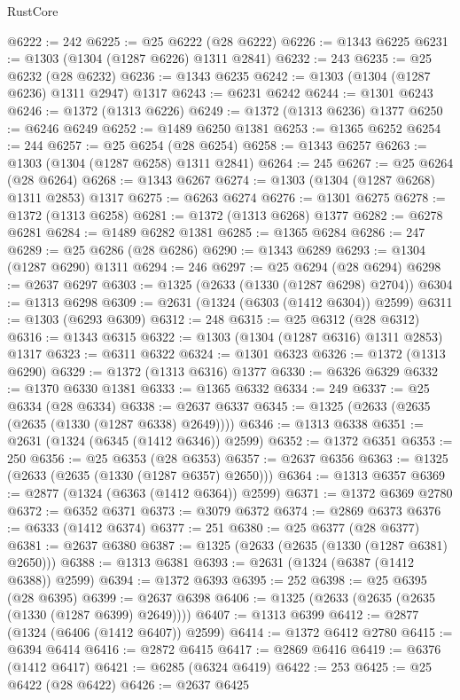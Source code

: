 \begin{lexlean}{RustCore}
\begin{coremodule}
@6222 := 242
@6225 := @25 @6222 (@28 @6222)
@6226 := @1343 @6225
@6231 := @1303 (@1304 (@1287 @6226) @1311 @2841)
@6232 := 243
@6235 := @25 @6232 (@28 @6232)
@6236 := @1343 @6235
@6242 := @1303 (@1304 (@1287 @6236) @1311 @2947) @1317
@6243 := @6231 @6242
@6244 := @1301 @6243
@6246 := @1372 (@1313 @6226)
@6249 := @1372 (@1313 @6236) @1377
@6250 := @6246 @6249
@6252 := @1489 @6250 @1381
@6253 := @1365 @6252
@6254 := 244
@6257 := @25 @6254 (@28 @6254)
@6258 := @1343 @6257
@6263 := @1303 (@1304 (@1287 @6258) @1311 @2841)
@6264 := 245
@6267 := @25 @6264 (@28 @6264)
@6268 := @1343 @6267
@6274 := @1303 (@1304 (@1287 @6268) @1311 @2853) @1317
@6275 := @6263 @6274
@6276 := @1301 @6275
@6278 := @1372 (@1313 @6258)
@6281 := @1372 (@1313 @6268) @1377
@6282 := @6278 @6281
@6284 := @1489 @6282 @1381
@6285 := @1365 @6284
@6286 := 247
@6289 := @25 @6286 (@28 @6286)
@6290 := @1343 @6289
@6293 := @1304 (@1287 @6290) @1311
@6294 := 246
@6297 := @25 @6294 (@28 @6294)
@6298 := @2637 @6297
@6303 := @1325 (@2633 (@1330 (@1287 @6298) @2704))
@6304 := @1313 @6298
@6309 := @2631 (@1324 (@6303 (@1412 @6304)) @2599)
@6311 := @1303 (@6293 @6309)
@6312 := 248
@6315 := @25 @6312 (@28 @6312)
@6316 := @1343 @6315
@6322 := @1303 (@1304 (@1287 @6316) @1311 @2853) @1317
@6323 := @6311 @6322
@6324 := @1301 @6323
@6326 := @1372 (@1313 @6290)
@6329 := @1372 (@1313 @6316) @1377
@6330 := @6326 @6329
@6332 := @1370 @6330 @1381
@6333 := @1365 @6332
@6334 := 249
@6337 := @25 @6334 (@28 @6334)
@6338 := @2637 @6337
@6345 := @1325 (@2633 (@2635 (@2635 (@1330 (@1287 @6338) @2649))))
@6346 := @1313 @6338
@6351 := @2631 (@1324 (@6345 (@1412 @6346)) @2599)
@6352 := @1372 @6351
@6353 := 250
@6356 := @25 @6353 (@28 @6353)
@6357 := @2637 @6356
@6363 := @1325 (@2633 (@2635 (@1330 (@1287 @6357) @2650)))
@6364 := @1313 @6357
@6369 := @2877 (@1324 (@6363 (@1412 @6364)) @2599)
@6371 := @1372 @6369 @2780
@6372 := @6352 @6371
@6373 := @3079 @6372
@6374 := @2869 @6373
@6376 := @6333 (@1412 @6374)
@6377 := 251
@6380 := @25 @6377 (@28 @6377)
@6381 := @2637 @6380
@6387 := @1325 (@2633 (@2635 (@1330 (@1287 @6381) @2650)))
@6388 := @1313 @6381
@6393 := @2631 (@1324 (@6387 (@1412 @6388)) @2599)
@6394 := @1372 @6393
@6395 := 252
@6398 := @25 @6395 (@28 @6395)
@6399 := @2637 @6398
@6406 := @1325 (@2633 (@2635 (@2635 (@1330 (@1287 @6399) @2649))))
@6407 := @1313 @6399
@6412 := @2877 (@1324 (@6406 (@1412 @6407)) @2599)
@6414 := @1372 @6412 @2780
@6415 := @6394 @6414
@6416 := @2872 @6415
@6417 := @2869 @6416
@6419 := @6376 (@1412 @6417)
@6421 := @6285 (@6324 @6419)
@6422 := 253
@6425 := @25 @6422 (@28 @6422)
@6426 := @2637 @6425

\end{coremodule}
\end{lexlean}
